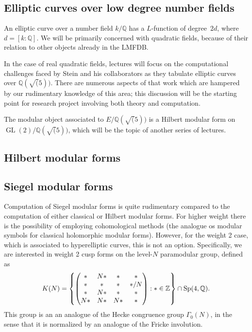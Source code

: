 \documentclass[amstex,11pt]{amsart}
\DeclareMathOperator{\GL}{GL}
\numberwithin{equation}{section}
\newcommand{\Q}{\mathbb Q}
\begin{document}
\subsection{Elliptic curves over low degree number fields}

An elliptic curve over a number field $k/\Q$ has a $L$-function of
degree~$2d$, where $d=[k:\Q]$.  We will be primarily concerned with
quadratic fields, because of their relation to other objects already
in the LMFDB.

In the case of real quadratic fields, lectures will focus on the
computational challenges faced by Stein and his collaborators as they
tabulate elliptic curves over $\Q(\sqrt(5))$.  There are numerous
aspects of that work which are hampered by our rudimentary knowledge
of this area; this discussion will be the starting point for research
project involving both theory and computation.

The modular object associated to $E/\Q(\sqrt(5))$ is a Hilbert modular
form on $\GL(2)/\Q(\sqrt(5))$, which will be the topic of another
series of lectures.


\subsection{Hilbert modular forms}

\subsection{Siegel modular forms}

Computation of Siegel modular forms is quite rudimentary compared to
the computation of either classical or Hilbert modular forms.  For
higher weight there is the possibility of employing cohomological
methods (the analogue os modular symbols for classical holomorphic
modular forms).  However, for the weight 2 case, which is associated
to hyperelliptic curves, this is not an option.  Specifically, we are
interested in weight 2 cusp forms on the level-$N$ paramodular group,
defined as
$$
K(N)=\left\{
\left(\begin{matrix}
  * & N* & * &*\\
* & * & * & */N\\
* & N* &*&*\\
N*&N*&N*&*
\end{matrix}\right)
:
*\in{\Bbb Z}\right\}\cap \mathrm{Sp}(4, {\Bbb Q}).
$$
This group is an an analogue of the Hecke congruence group
$\Gamma_0(N)$, in the sense that it is normalized by an analogue of
the Fricke involution.
\end{document}
